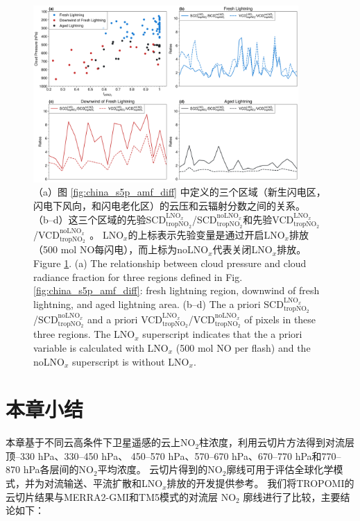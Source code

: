 \begin{figure}[H]
    \centering
    \includegraphics[width=0.9\textwidth]{./figures/china_amf_contribution.png}
    \caption{
    （a）图 \ref{fig:china_s5p_amf_diff} 中定义的三个区域（新生闪电区，闪电下风向，和闪电老化区）的云压和云辐射分数之间的关系。
     （b--d）这三个区域的先验SCD$^{\textrm{LNO$_x$}}_{\textrm{tropNO$_2$}}$/SCD$^{\textrm{noLNO$_x$}}_{ \textrm{tropNO$_2$}}$和先验VCD$^{\textrm{LNO$_x$}}_{\textrm{tropNO$_2$}}$/VCD$^{\textrm{noLNO$_x$ }}_{\textrm{tropNO$_2$}}$。
     LNO$_x$的上标表示先验变量是通过开启LNO$_x$排放（500 mol NO每闪电），而上标为noLNO$_x$代表关闭LNO$_x$排放。\\
     Figure \ref{fig:china_amf_contribution}. (a) The relationship between cloud pressure and cloud radiance fraction for three regions defined in Fig. \ref{fig:china_s5p_amf_diff}: fresh lightning region, downwind of fresh lightning, and aged lightning area.
    (b--d) The a priori SCD$^{\textrm{LNO$_x$}}_{\textrm{tropNO$_2$}}$/SCD$^{\textrm{noLNO$_x$}}_{\textrm{tropNO$_2$}}$ and a priori VCD$^{\textrm{LNO$_x$}}_{\textrm{tropNO$_2$}}$/VCD$^{\textrm{noLNO$_x$}}_{\textrm{tropNO$_2$}}$ of pixels in these three regions. The LNO$_x$ superscript indicates that the a priori variable is calculated with LNO$_x$ (500 mol NO per flash) and the noLNO$_x$ superscript is without LNO$_x$.
    }
    \label{fig:china_amf_contribution}
\end{figure}


\section{本章小结}

本章基于不同云高条件下卫星遥感的云上NO$_2$柱浓度，利用云切片方法得到对流层顶--330 hPa、330--450 hPa、
450--570 hPa、570--670 hPa、670--770 hPa和770--870 hPa各层间的NO$_2$平均浓度。
云切片得到的NO$_2$廓线可用于评估全球化学模式，并为对流输送、平流扩散和LNO$_x$排放的开发提供参考。
我们将TROPOMI的云切片结果与MERRA2-GMI和TM5模式的对流层 NO$_2$ 廓线进行了比较，主要结论如下：

